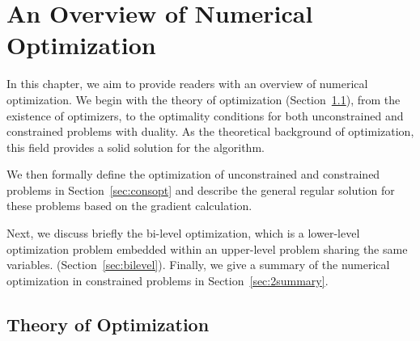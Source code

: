 \chapter{An Overview of Numerical Optimization}
\label{cha:overviewpart1}
In this chapter, we aim to provide readers with an overview of numerical optimization. We begin with the theory of optimization (Section~\ref{sec:theory}), from the existence of optimizers, to the optimality conditions for both unconstrained and constrained problems with duality. As the theoretical background of optimization, this field provides a solid solution for the algorithm. 
\par We then formally define the optimization of unconstrained and constrained problems in Section~\ref{sec:consopt} and describe the general regular solution for these problems based on the gradient calculation. 
\par Next, we discuss briefly the bi-level optimization, which is a lower-level optimization problem embedded within an upper-level problem sharing the same variables. (Section~\ref{sec:bilevel}). Finally, we give a summary of the numerical optimization in constrained problems in Section~\ref{sec:2summary}.




\section{Theory of Optimization}
\label{sec:theory}
